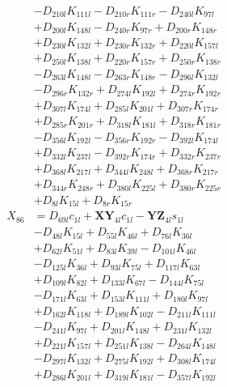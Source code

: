 \begin{multicols}{2}
\begin{align}
&- D_{210l}K_{111l} - D_{210r}K_{111r} - D_{240l}K_{97l}  \nonumber \\
&+ D_{200l}K_{148l} - D_{240r}K_{97r} + D_{200r}K_{148r}  \nonumber \\
&+ D_{230l}K_{132l} + D_{230r}K_{132r} + D_{220l}K_{157l}  \nonumber \\
&+ D_{250l}K_{138l} + D_{220r}K_{157r} + D_{250r}K_{138r}  \nonumber \\
&- D_{263l}K_{148l} - D_{263r}K_{148r} - D_{296l}K_{132l}  \nonumber \\
&- D_{296r}K_{132r} + D_{274l}K_{192l} + D_{274r}K_{192r}  \nonumber \\
&+ D_{307l}K_{174l} + D_{285l}K_{201l} + D_{307r}K_{174r}  \nonumber \\
&+ D_{285r}K_{201r} + D_{318l}K_{181l} + D_{318r}K_{181r}  \nonumber \\
&- D_{356l}K_{192l} - D_{356r}K_{192r} - D_{392l}K_{174l}  \nonumber \\
&+ D_{332l}K_{237l} - D_{392r}K_{174r} + D_{332r}K_{237r}  \nonumber \\
&+ D_{368l}K_{217l} + D_{344l}K_{248l} + D_{368r}K_{217r}  \nonumber \\
&+ D_{344r}K_{248r} + D_{380l}K_{225l} + D_{380r}K_{225r}  \nonumber \\
&+ D_{8l}K_{15l} + D_{8r}K_{15r} \nonumber \\
X_{86} &= D_{69l}c_{1l} + \mathbf{XY}_{4l}c_{1l} - \mathbf{YZ}_{4l}s_{1l}  \nonumber \\
&- D_{48l}K_{15l} + D_{55l}K_{46l} + D_{76l}K_{36l}  \nonumber \\
&+ D_{62l}K_{51l} + D_{83l}K_{39l} - D_{101l}K_{46l}  \nonumber \\
&- D_{125l}K_{36l} + D_{93l}K_{75l} + D_{117l}K_{63l}  \nonumber \\
&+ D_{109l}K_{82l} + D_{133l}K_{67l} - D_{144l}K_{75l}  \nonumber \\
&- D_{171l}K_{63l} + D_{153l}K_{111l} + D_{180l}K_{97l}  \nonumber \\
&+ D_{162l}K_{118l} + D_{189l}K_{102l} - D_{211l}K_{111l}  \nonumber \\
&- D_{241l}K_{97l} + D_{201l}K_{148l} + D_{231l}K_{132l}  \nonumber \\
&+ D_{221l}K_{157l} + D_{251l}K_{138l} - D_{264l}K_{148l}  \nonumber \\
&- D_{297l}K_{132l} + D_{275l}K_{192l} + D_{308l}K_{174l}  \nonumber \\
&+ D_{286l}K_{201l} + D_{319l}K_{181l} - D_{357l}K_{192l}  \nonumber \\

\end{align}
\end{multicols}
